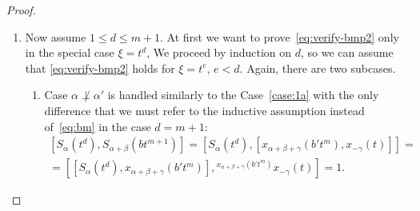 \documentclass[oneside, 10pt]{amsart}
\numberwithin{equation}{section}
\numberwithin{lemma}{section}
\theoremstyle{definition}
\theoremstyle{remark}
\begin{document}
\begin{proof}
\begin{enumerate}
\item \label{case:2} Now assume $1 \leq d \leq m+1$.
At first we want to prove~\eqref{eq:verify-bmp2} only in the special case $\xi=t^d$,
We proceed by induction on $d$, so we can assume that \eqref{eq:verify-bmp2} holds for $\xi = t^e$, $e<d$.
Again, there are two subcases.
\begin{enumerate}
 \item \label{case:2a} Case $\alpha\not\perp\alpha'$ is handled similarly to the Case~\eqref{case:1a} with the only
  difference that we must refer to the inductive assumption instead of~\eqref{eq:bm} in the case $d=m+1$:
  \begin{multline} \nonumber
   [S_\alpha(t^d), S_{\alpha+\beta}(bt^{m+1})] = [S_\alpha(t^d), [x_{\alpha+\beta+\gamma}(b't^m), x_{-\gamma}(t)]] = \\   
  = [[S_\alpha(t^d), x_{\alpha+\beta+\gamma}(b't^m)], {}^{x_{\alpha+\beta+\gamma}(b't^m)}\!x_{-\gamma}(t)] = 1.
  \end{multline}
  

\end{enumerate}
\end{enumerate}
\end{proof}
\end{document}
